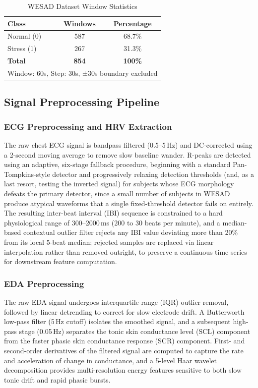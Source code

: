 \documentclass[conference]{IEEEtran}
\begin{document}
\begin{table}[htbp]
\caption{WESAD Dataset Window Statistics}
\begin{center}
\begin{tabular}{|l|c|c|}
\hline
\textbf{Class} &
\textbf{Windows} &
\textbf{Percentage} \\
\hline
Normal (0) & 587 & 68.7\% \\
Stress (1) & 267 & 31.3\% \\
\hline
\textbf{Total} & \textbf{854} & \textbf{100\%} \\
\hline
\multicolumn{3}{l}{Window: 60s, Step: 30s,
±30s boundary excluded} \\
\end{tabular}
\label{tab_dataset}
\end{center}
\end{table}

\subsection{Signal Preprocessing Pipeline}

\subsubsection{ECG Preprocessing and HRV Extraction}
The raw chest ECG signal is bandpass filtered (0.5–5\,Hz) and
DC-corrected using a 2-second moving average to remove slow
baseline wander. R-peaks are detected using an adaptive,
six-stage fallback procedure, beginning with a standard
Pan-Tompkins-style detector and progressively relaxing
detection thresholds (and, as a last resort, testing the
inverted signal) for subjects whose ECG morphology defeats the
primary detector, since a small number of subjects in WESAD
produce atypical waveforms that a single fixed-threshold
detector fails on entirely. The resulting inter-beat interval
(IBI) sequence is constrained to a hard physiological range of
300–2000\,ms (200 to 30 beats per minute), and a
median-based contextual outlier filter rejects any IBI value
deviating more than 20\% from its local 5-beat median; rejected
samples are replaced via linear interpolation rather than
removed outright, to preserve a continuous time series for
downstream feature computation.

\subsubsection{EDA Preprocessing}
The raw EDA signal undergoes interquartile-range (IQR) outlier
removal, followed by linear detrending to correct for slow
electrode drift. A Butterworth low-pass filter (5\,Hz cutoff)
isolates the smoothed signal, and a subsequent high-pass stage
(0.05\,Hz) separates the tonic skin conductance level (SCL)
component from the faster phasic skin conductance response
(SCR) component. First- and second-order derivatives of the
filtered signal are computed to capture the rate and
acceleration of change in conductance, and a 5-level Haar
wavelet decomposition provides multi-resolution energy
features sensitive to both slow tonic drift and rapid phasic
bursts.
\end{document}
